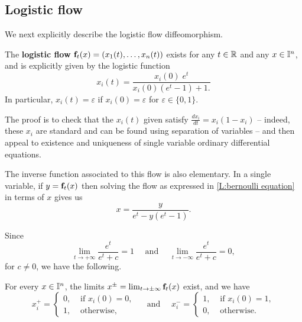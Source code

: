 \subsection{Logistic flow}

We next explicitly describe the logistic flow diffeomorphism.

\begin{lemma}\label{L:bernoulli equation}
	The {\bf logistic flow} $\mathbf{f}_t(x) = (x_1(t), \dots, x_n(t))$ exists for any $t \in \mathbb{R}$ and any $x \in \mathbb{I}^n$,
	and is explicitly given by the logistic function
	\begin{equation*}
		x_i(t) = \frac{x_i(0) \; e^t}{x_i(0)(e^t-1)+1.}
	\end{equation*}
	In particular, $x_i(t) = \varepsilon$ if $x_i(0) = \varepsilon$ for $\varepsilon \in \{0, 1\}$.
\end{lemma}

The proof is to check that the $x_i(t)$ given satisfy $\frac{d x_i}{dt} = x_i(1- x_i)$ -- indeed, these $x_i$ are standard and can be found using separation of variables -- and then appeal to existence and uniqueness of single variable ordinary differential equations.

The inverse function associated to this flow is also elementary.
In a single variable, if $y = \mathbf{f}_t(x)$ then solving the flow as expressed in \cref{L:bernoulli equation} in terms of $x$ gives us
\begin{equation}\label{E:inverse flow}
	x = \frac{y}{e^t - y(e^t-1)}.
\end{equation}

Since
\begin{equation*}
	\lim_{t \to + \infty} \frac{e^t}{e^t + c} = 1
	\quad \text{ and } \quad
	\lim_{t \to - \infty} \frac{e^t}{e^t + c} = 0,
\end{equation*}
for $c\neq 0$, we have the following.

\begin{corollary}\label{C:limit of points along the flow}
	For every $x \in \mathbb{I}^n$, the limits $x^\pm = \lim_{t \to \pm \infty} \mathbf{f}_t(x)$ 	exist, and we have
	\begin{equation*}
		x^+_i = \begin{cases}
			0, & \text{ if } x_i(0) = 0, \\ 1, & \text{ otherwise,}
		\end{cases}
		\quad \text{ and } \quad
		x^-_i = \begin{cases}
			1, & \text{ if } x_i(0) = 1, \\ 0, & \text{ otherwise.}
		\end{cases}
	\end{equation*}
\end{corollary}

